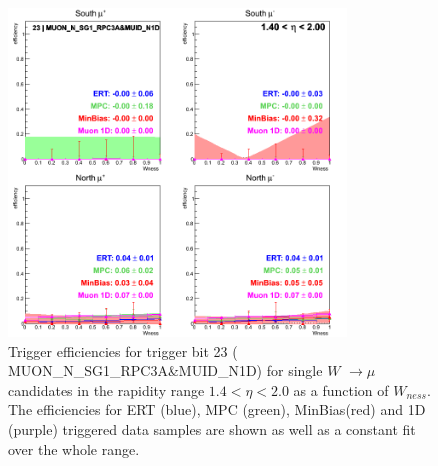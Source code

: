 \begin{figure}[h!]

  \centering

  \includegraphics[width=0.8\textwidth]{./figures/run13_trigeffisn_eta1_trig23_lin.png}
  \caption{\label{fig:run13_trigeffisn_eta1_nper0_trig23_lin} Trigger efficiencies for trigger bit 23 ( MUON\_N\_SG1\_RPC3A\&MUID\_N1D) for single $W$ $\rightarrow \mu$ candidates in the rapidity range $ 1.4 < \eta < 2.0$ as a function of $W_{ness}$. The efficiencies for ERT (blue), MPC (green), MinBias(red) and 1D (purple) triggered data samples are shown as well as a constant fit over the whole range.}

\end{figure}
\clearpage
